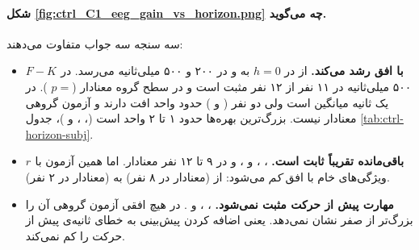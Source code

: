 \paragraph{شکل \ref{fig:ctrl_C1_eeg_gain_vs_horizon.png} چه می‌گوید.} سه سنجه سه جواب متفاوت می‌دهند:
\begin{itemize}
\item \textbf{$F-K$ با افق رشد می‌کند.} از  در $h=0$ به  و  در ۲۰۰ و ۵۰۰ میلی‌ثانیه می‌رسد. در ۵۰۰ میلی‌ثانیه در ۱۱ نفر از ۱۲ نفر مثبت است و در سطح گروه معنادار ($p=$ ). در یک ثانیه میانگین  است ولی دو نفر ( و ) حدود  واحد افت دارند و آزمون گروهی معنادار نیست. بزرگ‌ترین بهره‌ها حدود ۱ تا ۲ واحد  است (، ،  و )، جدول \ref{tab:ctrl-horizon-subj}.
\item \textbf{$r$ باقی‌مانده تقریباً ثابت است.} ، ،  و ، و در ۹ تا ۱۲ نفر معنادار. اما همین آزمون با ویژگی‌های خام  با افق \emph{کم} می‌شود: از  (معنادار در ۸ نفر) به  (معنادار در ۲ نفر).
\item \textbf{مهارت پیش از حرکت مثبت نمی‌شود.} ، ،  و . در هیچ افقی آزمون گروهی آن را بزرگ‌تر از صفر نشان نمی‌دهد. یعنی اضافه کردن پیش‌بینی  به  خطای ثانیه‌ی پیش از حرکت را کم نمی‌کند.
\end{itemize}





